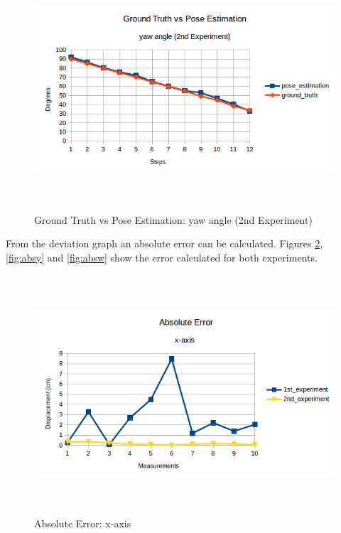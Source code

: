 \begin{figure}[!h]
\begin{center}
\includegraphics[width=5in, height=3.5in]{figures05/2_yaw_validation.png}
\caption{Ground Truth vs Pose Estimation: yaw angle (2nd Experiment)}
\label{fig:erroryaw_2nd}
\end{center}
\end{figure}

From the deviation graph an absolute error can be calculated. Figures \ref{fig:absx}, \ref{fig:absy} and \ref{fig:absw} show the error calculated for both experiments.

\begin{figure}[!h]
\begin{center}
\includegraphics[width=5in, height=3.5in]{figures05/abs_error_x.png}
\caption{Absolute Error: x-axis}
\label{fig:absx}
\end{center}
\end{figure}

